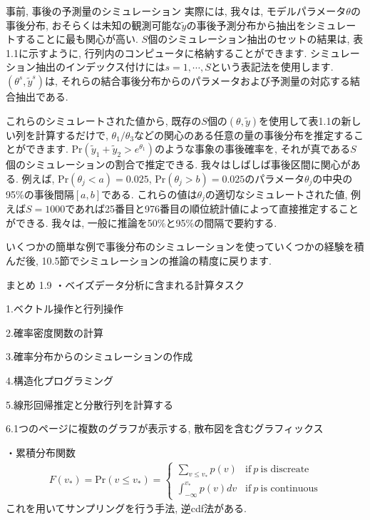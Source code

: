 \documentclass[10pt,dvipdfmx,a4]{beamer}
\newcommand{\eqn}[1]{\begin{align*}#1\end{align*}}
\begin{document}
\begin{frame}{事前, 事後の予測量のシミュレーション}
実際には, 我々は, モデルパラメータ$\theta$の事後分布, おそらくは未知の観測可能な$\tilde{y}$の事後予測分布から抽出をシミュレートすることに最も関心が高い.
$S$個のシミュレーション抽出のセットの結果は, 表1.1に示すように, 行列内のコンピュータに格納することができます.
シミュレーション抽出のインデックス付けには$s=1,\cdots,S$という表記法を使用します.
$(\theta^s,\tilde{y}^s)$は, それらの結合事後分布からのパラメータおよび予測量の対応する結合抽出である.

これらのシミュレートされた値から, 既存の$S$個の$(\theta,\tilde{y})$を使用して表1.1の新しい列を計算するだけで, $\theta_1/\theta_3$などの関心のある任意の量の事後分布を推定することができます.
$\text{Pr}(\tilde{y}_1+\tilde{y}_2>e^{\theta_1})$のような事象の事後確率を, それが真である$S$個のシミュレーションの割合で推定できる.
我々はしばしば事後区間に関心がある.
例えば, $\text{Pr}(\theta_j<a)=0.025$, $\text{Pr}(\theta_j>b)=0.025$のパラメータ$\theta_j$の中央の95\%の事後間隔$[a, b]$である.
これらの値は$\theta_j$の適切なシミュレートされた値, 例えば$S=1000$であれば25番目と976番目の順位統計値によって直接推定することができる.
我々は, 一般に推論を50\%と95\%の間隔で要約する.

いくつかの簡単な例で事後分布のシミュレーションを使っていくつかの経験を積んだ後, 10.5節でシミュレーションの推論の精度に戻ります.
\end{frame}


\begin{frame}{まとめ 1.9}
・ベイズデータ分析に含まれる計算タスク

1.ベクトル操作と行列操作

2.確率密度関数の計算

3.確率分布からのシミュレーションの作成

4.構造化プログラミング

5.線形回帰推定と分散行列を計算する

6.1つのページに複数のグラフが表示する, 散布図を含むグラフィックス

・累積分布関数
\eqn{F(v_*)=\text{Pr}(v\leq v_*)
=\begin{cases}
\sum_{v\leq v_*} p(v) &\text{if}\ p\ \text{is discreate}\\
\int_{-\infty}^{v_*} p(v)dv &\text{if}\ p\ \text{is continuous}
\end{cases}}
これを用いてサンプリングを行う手法, 逆cdf法がある.
\end{frame}
\end{document}
